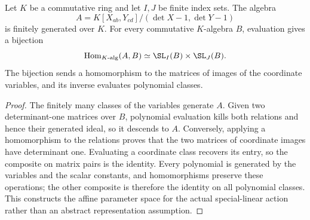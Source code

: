 \begin{lemma}
\label{lem:balanced-special-linear-coordinates}
\leanok
Let $K$ be a commutative ring and let $I,J$ be finite index sets. The algebra
\[
 A=K[X_{ab},Y_{cd}]/(\det X-1,\det Y-1)
\]
is finitely generated over $K$. For every commutative $K$-algebra $B$,
evaluation gives a bijection
\[
 \operatorname{Hom}_{K\text{-alg}}(A,B)
 \simeq \SL_I(B)\times\SL_J(B).
\]
The bijection sends a homomorphism to the matrices of images of the
coordinate variables, and its inverse evaluates polynomial classes.
\end{lemma}
\begin{proof}
The finitely many classes of the variables generate $A$. Given two
determinant-one matrices over $B$, polynomial evaluation kills both
relations and hence their generated ideal, so it descends to $A$.
Conversely, applying a homomorphism to the relations proves that the
two matrices of coordinate images have determinant one. Evaluating a
coordinate class recovers its entry, so the composite on matrix pairs
is the identity. Every polynomial is generated by the variables and
the scalar constants, and homomorphisms preserve these operations;
the other composite is therefore the identity on all polynomial
classes. This constructs the affine parameter space for the actual
special-linear action rather than an abstract representation assumption.
\end{proof}

